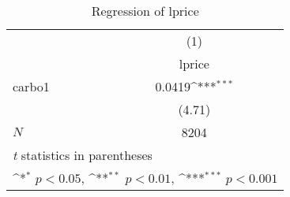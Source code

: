 \begin{table}[htbp]\centering
\def\sym#1{\ifmmode^{#1}\else\(^{#1}\)\fi}
\caption{Regression of lprice \label{tabcarb1}}
\begin{tabular}{l*{1}{c}}
\hline\hline
            &\multicolumn{1}{c}{(1)}\\
            &\multicolumn{1}{c}{lprice}\\
\hline
carbo1      &      0.0419\sym{***}\\
            &      (4.71)         \\
\hline
\(N\)       &        8204         \\
\hline\hline
\multicolumn{2}{l}{\footnotesize \textit{t} statistics in parentheses}\\
\multicolumn{2}{l}{\footnotesize \sym{*} \(p<0.05\), \sym{**} \(p<0.01\), \sym{***} \(p<0.001\)}\\
\end{tabular}
\end{table}
